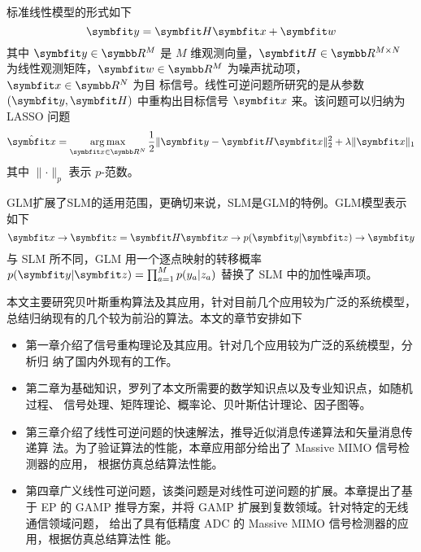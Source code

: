 \documentclass[type=master]{../gdutthesis}
\newcommand{\mbb}{\symbb}
\newcommand{\mbfit}{\symbfit}
\DeclareMathOperator*{\argmax}{arg\,max}
\begin{document}
\gduttableofcontents

\mainmatter


标准线性模型的形式如下
\begin{equation}
  \mbfit y = \mbfit H \mbfit x + \mbfit w
\end{equation}
其中 $\mbfit y \in \mbb R^M$ 是 $M$ 维观测向量，$\mbfit H \in \mbb R^{M \times N}$
为线性观测矩阵，$\mbfit w \in \mbb R^M$ 为噪声扰动项，$\mbfit x \in \mbb R^N$ 为目
标信号。线性可逆问题所研究的是从参数 $(\mbfit y, \mbfit H)$ 中重构出目标信号 $\mbfit x$ 来。该问题可以归纳为 LASSO 问题
\begin{equation}
  \hat{ \mbfit x } = \argmax_{ \mbfit x \in \mbb R^N } \frac{1}{2} \lVert \mbfit y - \mbfit H \mbfit x \rVert_2^2 + \lambda \lVert \mbfit x \rVert_1
\end{equation}
其中 $\lVert · \rVert_p$ 表示 $p$-范数。

GLM扩展了SLM的适用范围，更确切来说，SLM是GLM的特例。GLM模型表示如下
\begin{equation}
  \mbfit x \to \mbfit z = \mbfit H \mbfit x \to p( \mbfit y | \mbfit z ) \to \mbfit y
\end{equation}
与 SLM 所不同，GLM 用一个逐点映射的转移概率
$p( \mbfit y | \mbfit z ) = \prod_{a=1}^M p( y_a | z_a )$
替换了 SLM 中的加性噪声项。


本文主要研究贝叶斯重构算法及其应用，针对目前几个应用较为广泛的系统模型，
总结归纳现有的几个较为前沿的算法。本文的章节安排如下

\begin{itemize}
  \item 第一章介绍了信号重构理论及其应用。针对几个应用较为广泛的系统模型，分析归
  纳了国内外现有的工作。
  \item 第二章为基础知识，罗列了本文所需要的数学知识点以及专业知识点，如随机过程、
  信号处理、矩阵理论、概率论、贝叶斯估计理论、因子图等。
  \item 第三章介绍了线性可逆问题的快速解法，推导近似消息传递算法和矢量消息传递算
  法。为了验证算法的性能，本章应用部分给出了 Massive MIMO 信号检测器的应用，
  根据仿真总结算法性能。
  \item 第四章广义线性可逆问题，该类问题是对线性可逆问题的扩展。本章提出了基于 
  EP 的 GAMP 推导方案，并将 GAMP 扩展到复数领域。针对特定的无线通信领域问题，
  给出了具有低精度 ADC 的 Massive MIMO 信号检测器的应用，根据仿真总结算法性
  能。
\end{itemize}
\end{document}
